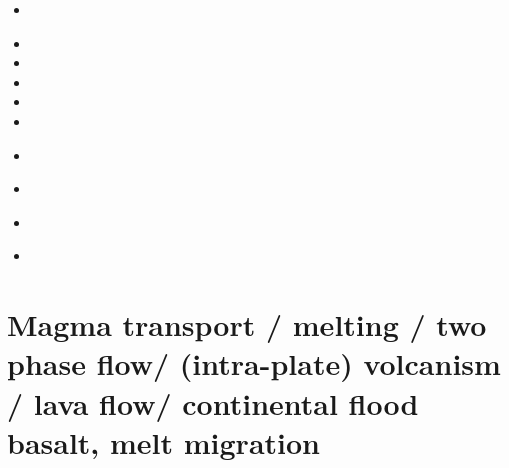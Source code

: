 \begin{small}
\begin{itemize}
\item[\nineteenninetythree] 
 \\
\item[\twothousandtwo] 
\item[\twothousandsix] 
\item[\twothousandseven] 
\item[\twothousandten] 
\item[\twothousandtwelve] 
\item[\twothousandthirteen] 
 \\
\item[\twothousandfifteen] 
\item[\twothousandtwenty] 
 \\
\item[\twothousandtwentythree] 
\end{itemize}
\end{small}

\section{Magma transport / melting / two phase flow/ (intra-plate) volcanism / lava flow/ 
continental flood basalt, melt migration}

